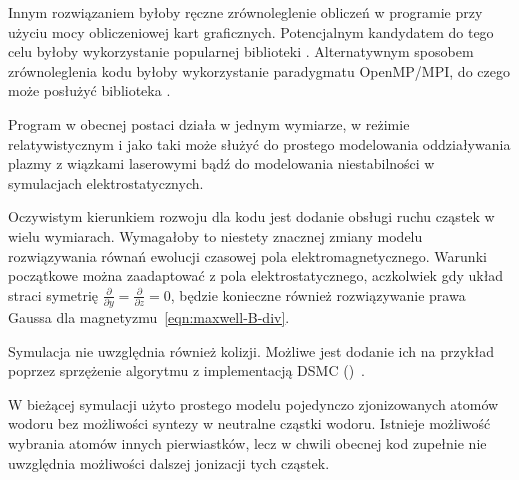 Innym rozwiązaniem byłoby ręczne zrównoleglenie obliczeń w programie przy użyciu mocy obliczeniowej kart graficznych. Potencjalnym kandydatem do tego celu byłoby wykorzystanie popularnej biblioteki .
Alternatywnym sposobem zrównoleglenia kodu byłoby wykorzystanie paradygmatu OpenMP/MPI, do czego może posłużyć biblioteka .

Program w obecnej postaci działa w jednym wymiarze, w reżimie relatywistycznym i jako taki może służyć do prostego modelowania oddziaływania plazmy z wiązkami laserowymi
bądź do modelowania niestabilności w symulacjach elektrostatycznych.

Oczywistym kierunkiem rozwoju dla kodu jest dodanie obsługi ruchu cząstek w wielu wymiarach. Wymagałoby to niestety znacznej zmiany modelu rozwiązywania równań ewolucji czasowej pola elektromagnetycznego.
Warunki początkowe można zaadaptować z pola elektrostatycznego, aczkolwiek gdy układ straci symetrię $\frac{\partial}{\partial y} = \frac{\partial}{\partial z} = 0$, będzie konieczne również rozwiązywanie
prawa Gaussa dla magnetyzmu~\ref{eqn:maxwell-B-div}.

Symulacja nie uwzględnia również kolizji. Możliwe jest dodanie ich na przykład poprzez sprzężenie algorytmu z implementacją DSMC ()~\cite{particleincell-dmsc}.

W bieżącej symulacji użyto prostego modelu pojedynczo zjonizowanych atomów wodoru bez możliwości syntezy w neutralne cząstki wodoru. Istnieje możliwość wybrania atomów innych pierwiastków,
lecz w chwili obecnej kod zupełnie nie uwzględnia możliwości dalszej jonizacji tych cząstek.

